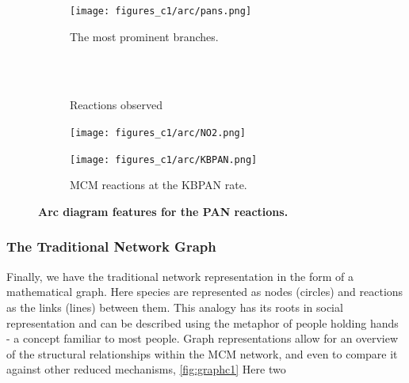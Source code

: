 \begin{figure}[H]
     \centering
      \begin{subfigure}[b]{.4\textwidth}
         \centering
         \texttt{[image: figures\_c1/arc/pans.png]}
         \caption{The most prominent branches. }
         \label{fig:pansdir}
     \end{subfigure}
      \begin{subfigure}[b]{.4\textwidth}
         \centering
            \\ \ \\
    \hfill
         \caption{Reactions observed}
         \label{fig:rxnpan}
     \end{subfigure}
     \begin{subfigure}[b]{.4\textwidth}
         \centering
         \texttt{[image: figures\_c1/arc/NO2.png]}
         \caption{}
         \label{fig:no2}
     \end{subfigure}
     \begin{subfigure}[b]{.4\textwidth}
         \centering
         \texttt{[image: figures\_c1/arc/KBPAN.png]}
         \caption{MCM reactions at the KBPAN rate.}
         \label{fig:kbpan}
     \end{subfigure}
      \caption{\textbf{ Arc diagram features for the PAN reactions. } }
        \label{fig:panno2}
\end{figure}



%
%


\subsubsection{The Traditional Network Graph}\label{sec:tradnetconc}

Finally, we have the traditional network representation in the form of a mathematical graph. Here species are represented as nodes (circles) and reactions as the links (lines) between them. This analogy has its roots in social representation and can be described using the metaphor of people holding hands - a concept familiar to most people. Graph representations allow for an overview of the structural relationships within the MCM network, and even to compare it against other reduced mechanisms, \autoref{fig:graphc1}
Here two 





